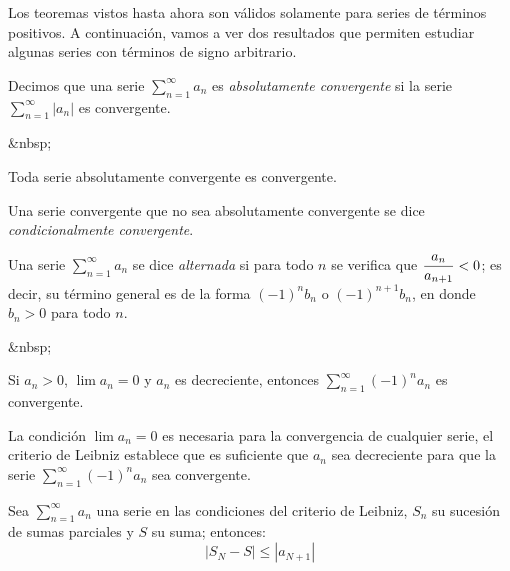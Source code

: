 Los teoremas vistos hasta ahora son válidos solamente para series de términos positivos. A continuación, vamos a ver dos resultados que permiten estudiar algunas series con términos de signo arbitrario.

\begin{definicion} Decimos que una serie $\displaystyle\sum_{n=1}^\infty  a_n$ es
\emph{absolutamente convergente} si la serie $\displaystyle\sum_{n=1}^\infty  |a_n|$ es
convergente.
\end{definicion}
\begin{rawhtml}
&nbsp;
\end{rawhtml}
\begin{teorema} Toda serie absolutamente convergente es
convergente.
\end{teorema}

Una serie convergente que no sea absolutamente convergente se dice \emph{condicionalmente convergente}.

\begin{definicion} Una serie $\displaystyle\sum_{n=1}^\infty  a_n$ se dice \emph{alternada} si para todo $n$
se verifica que $\dfrac{a_n}{a_{n+1}}< 0$; es decir, su término general es
de la forma $(-1)^nb_n$ o $(-1)^{n+1}b_n$, en donde $b_n>0$ para todo $n$.
\end{definicion}
\begin{rawhtml}
&nbsp;
\end{rawhtml}
\begin{teorema}
Si $a_n>0$, $\lim a_n=0$ y $a_n$ es decreciente, entonces $\displaystyle\sum_{n=1}^\infty  (-1)^na_n$ es convergente. \end{teorema}

La condición $\lim a_n = 0$ es necesaria para la convergencia de cualquier serie, el criterio de Leibniz establece que es suficiente que $a_n$ sea decreciente para que la serie
$\displaystyle\sum_{n=1}^\infty  (-1)^na_n$ sea convergente.


\begin{proposicion}
\label{P-error-leibniz} Sea $\displaystyle\sum_{n=1}^\infty   a_n$ una serie en las
condiciones del criterio de Leibniz, $S_n$ su sucesión de sumas
parciales y $S$ su suma; entonces:
\[
|S_N-S| \le |a_{N+1}|
\]
\end{proposicion}

